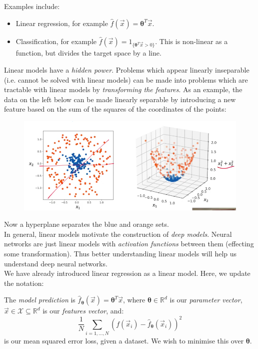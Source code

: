 \begin{frameex}
Examples include:
\begin{itemize}
\item Linear regression, for example $\hat{f}(\vec{x}) = \pmb{\theta}^T \vec{x}$.
\item Classification, for example $\hat{f}(\vec{x}) = 1_{\{\pmb{\theta}^T\vec{x} > 0\}}$. This is non-linear as a function, but divides the target space by a line.
\end{itemize}
\end{frameex}

Linear models have a \textit{hidden power}. Problems which appear linearly inseparable (i.e. cannot be solved with linear models) can be made into problems which are tractable with linear models by \textit{transforming the features}. As an example, the data on the left below can be made linearly separable by introducing a new feature based on the sum of the squares of the coordinates of the points:

\begin{figure}[H]
\centering
\includegraphics[scale=0.5]{hiddenlinear.png}
\end{figure}

Now a hyperplane separates the blue and orange sets.\\

In general, linear models motivate the construction of \textit{deep models}. Neural networks are just linear models with \textit{activation functions} between them (effecting some transformation). Thus better understanding linear models will help us understand deep neural networks. \\

We have already introduced linear regression as a linear model. Here, we update the notation:
\begin{framedef}
The \textit{model prediction} is $\hat{f}_{\pmb{\theta}}(\vec{x}) = \pmb{\theta}^T \vec{x}$, where $\pmb{\theta} \in \mathbb{R}^d$ is our \textit{parameter vector}, $\vec{x} \in \mathcal{X} \subseteq \mathbb{R}^d$ is our \textit{features vector}, and:
\begin{equation*}
\frac{1}{N} \sum_{i=1,...,N} \left( f(\vec{x}_i) - \hat{f}_{\pmb{\theta}}(\vec{x}_i) \right)^2
\end{equation*}
is our mean squared error loss, given a dataset. We wish to minimise this over $\pmb{\theta}$.
\end{framedef}


